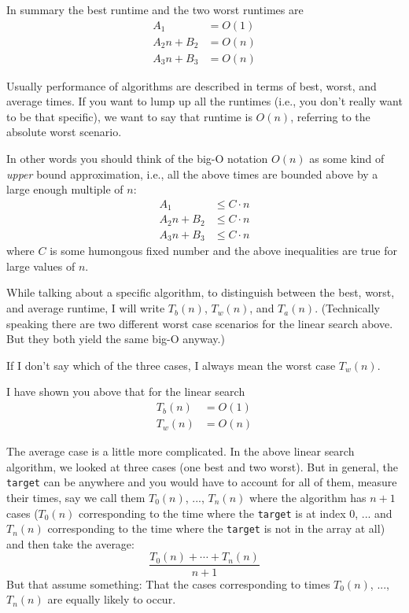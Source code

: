 In summary the best runtime and the two worst runtimes are
\begin{align*}
A_1 &= O(1) \\
A_2n + B_2 &= O(n) \\
A_3n + B_3 &= O(n) 
\end{align*}

Usually performance of algorithms are described in terms of
best, worst, and average times.
If you want to lump up all the runtimes (i.e., you don't really want to
be that specific), we want to say that runtime is $O(n)$, 
referring to the absolute worst scenario.

In other words you should think of the big-O notation $O(n)$
as some kind of \textit{upper} bound approximation, i.e.,
all the above times are bounded above by a large enough multiple of $n$:
\begin{align*}
A_1        &\leq C \cdot n \\
A_2n + B_2 &\leq C \cdot n \\
A_3n + B_3 &\leq C \cdot n
\end{align*}
where $C$ is some humongous fixed number and the above inequalities
are true for large values of $n$.

While talking about a specific algorithm, to distinguish between
the best, worst, and average runtime, I will write
$T_{b}(n)$,
$T_{w}(n)$,
and
$T_{a}(n)$.
(Technically speaking there are two different worst case scenarios
for the linear search above.
But they both yield the same big-O anyway.)

If I don't say which of the three cases, I always mean the 
worst case $T_w(n)$.

I have shown you above that for the linear search
\begin{align*}
T_b(n) &= O(1) \\
T_w(n) &= O(n)
\end{align*}

The average case is a little more complicated.
In the above linear search algorithm, we looked at
three cases (one best and two worst).
But in general, the \verb!target! can be anywhere and you would have to 
account for all of them, measure their times, 
say we call them $T_0(n)$, ..., $T_n(n)$
where the algorithm has $n + 1$ cases
($T_0(n)$ corresponding to the time where the \verb!target! is at index 0, ...
and $T_n(n)$ corresponding to the time where the \verb!target! is not
in the array at all)
and then take the average:
\[
\frac{T_0(n) + \cdots + T_n(n)}{n + 1}
\]
But that assume something: 
That the cases corresponding to times $T_0(n)$, ..., $T_n(n)$ are
equally likely to occur.

